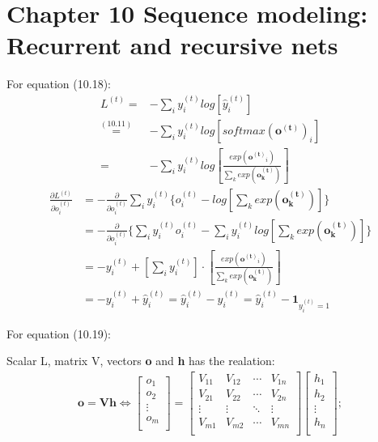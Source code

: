 \documentclass[12pt]{article}
\numberwithin{equation}{section}
\begin{document}
\section{Chapter 10 Sequence modeling: Recurrent and recursive nets}
For equation (10.18):
\begin{equation}\begin{split}
	L^{(t)} =& -\sum_{i}y_{i}^{(t)}log[\hat{y}_{i}^{(t)}] \\
	\overset{(10.11)}{=}& -\sum_{i}y_{i}^{(t)}log[softmax(\mathbf{o^{(t)}})_{i}] \\
	=& -\sum_{i}y_{i}^{(t)}log[\frac{exp(\mathbf{o^{(t)}}_{i})}{\sum_{k}exp(\mathbf{o^{(t)}_{k}})}]
\end{split}\end{equation}
\begin{equation}\begin{split}
	\frac{\partial L^{(t)}}{\partial o_i^{(t)}}
	&=-\frac{\partial}{\partial o_i^{(t)}} \sum_{i}y_{i}^{(t)} \{o_i^{(t)}-log[\sum_{k}exp(\mathbf{o^{(t)}_{k}})] \}\\
	&=-\frac{\partial}{\partial o_i^{(t)}} \{\sum_{i}y_{i}^{(t)} o_i^{(t)}-\sum_{i}y_{i}^{(t)} log[\sum_{k}exp(\mathbf{o^{(t)}_{k}})] \}\\
	&=-y_{i}^{(t)} + [\sum_{i}y_{i}^{(t)}] \cdot [\frac{exp(\mathbf{o^{(t)}}_{i})}{\sum_{k}exp(\mathbf{o^{(t)}_{k}})}]\\
	&=-y_{i}^{(t)} + \hat{y}_{i}^{(t)} = \hat{y}_{i}^{(t)} - y_{i}^{(t)} =  \hat{y}_{i}^{(t)} - \mathbf{1}_{y_{i}^{(t)}=1}
\end{split}\end{equation} \par
For equation (10.19): \par
Scalar L, matrix V, vectors \textbf{o} and \textbf{h} has the realation:  
\begin{equation}\begin{split}
	\mathbf{o}=\mathbf{Vh} \Leftrightarrow
	\begin{bmatrix}
		o_1\\ o_2\\ \vdots\\ o_m\\
	\end{bmatrix}=
	\begin{bmatrix}
		V_{11} & V_{12} & \cdots & V_{1n}\\
		V_{21} & V_{22} & \cdots & V_{2n}\\
		\vdots & \vdots & \ddots & \vdots\\
		V_{m1} & V_{m2} & \cdots & V_{mn}\\
	\end{bmatrix}
	\begin{bmatrix}
		h_1\\ h_2\\ \vdots\\ h_n\\
	\end{bmatrix};
\end{split}\end{equation}
\end{document}
